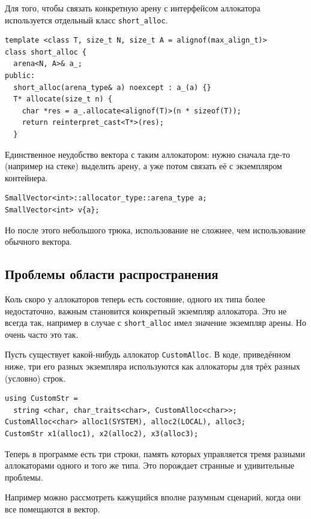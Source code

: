\documentclass[a4paper,12pt,oneside]{book}
\begin{document}
Для того, чтобы связать конкретную арену с интерфейсом аллокатора используется отдельный класс \lstinline!short_alloc!.

\begin{lstlisting}
template <class T, size_t N, size_t A = alignof(max_align_t)>
class short_alloc {
  arena<N, A>& a_;
public:
  short_alloc(arena_type& a) noexcept : a_(a) {}
  T* allocate(size_t n) {
    char *res = a_.allocate<alignof(T)>(n * sizeof(T));
    return reinterpret_cast<T*>(res);
  }
\end{lstlisting}

Единственное неудобство вектора с таким аллокатором: нужно сначала где-то (например на стеке) выделить арену, а уже потом связать её с экземпляром контейнера.

\begin{lstlisting}
SmallVector<int>::allocator_type::arena_type a;
SmallVector<int> v{a};
\end{lstlisting}

Но после этого небольшого трюка, использование не сложнее, чем использование обычного вектора.

\subsection{Проблемы области распространения}\label{sub:scopedalloc}

Коль скоро у аллокаторов теперь есть состояние, одного их типа более недостаточно, важным становится конкретный экземпляр аллокатора. Это не всегда так, например в случае с \lstinline!short_alloc! имел значение экземпляр арены. Но очень часто это так.

Пусть существует какой-нибудь аллокатор \lstinline!CustomAlloc!. В коде, приведённом ниже, три его разных экземпляра используются как аллокаторы для трёх разных (условно) строк.

\begin{lstlisting}
using CustomStr = 
  string <char, char_traits<char>, CustomAlloc<char>>;
CustomAlloc<char> alloc1(SYSTEM), alloc2(LOCAL), alloc3;
CustomStr x1(alloc1), x2(alloc2), x3(alloc3);
\end{lstlisting}

Теперь в программе есть три строки, память которых управляется тремя разными аллокаторами одного и того же типа. Это порождает странные и удивительные проблемы.

Например можно рассмотреть кажущийся вполне разумным сценарий, когда они все помещаются в вектор.
\end{document}
